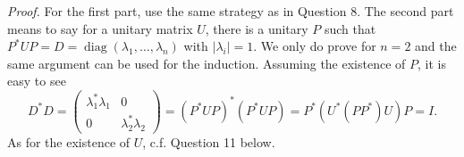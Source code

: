 \documentclass{mathproblems}
\begin{document}
\begin{questions}

\textit{Proof.} For the first part, use the same strategy as in Question 8. The second part means to say for a unitary matrix $U$, there is a unitary $P$ such that $P^*UP=D=\operatorname{diag}(\lambda_1,\ldots,\lambda_n)$ with $|\lambda_i|=1$. We only do prove for $n=2$ and the same argument can be used for the induction. Assuming the existence of $P$, it is easy to see
$$
D^*D=\begin{pmatrix}
\lambda_1^*\lambda_1 & 0 \\ 0 & \lambda_2^*\lambda_2
\end{pmatrix}=(P^*UP)^*(P^*UP)=P^*(U^*(PP^*)U)P=I.
$$
As for the existence of $U$, c.f. Question 11 below. 




\end{questions}
\end{document}
